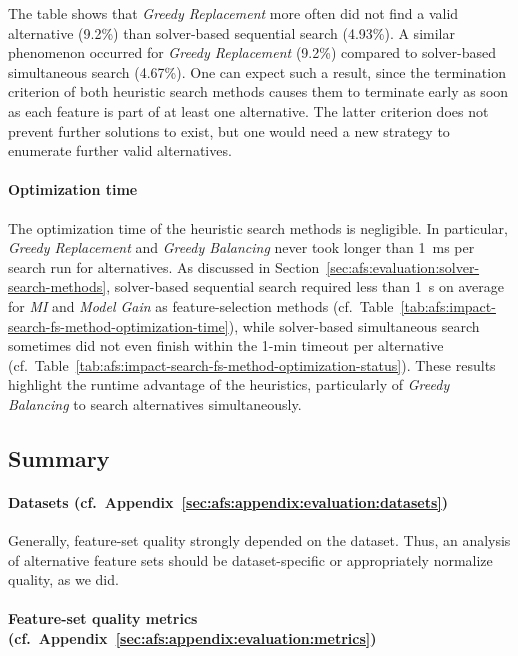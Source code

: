 \documentclass{article}
\theoremstyle{definition}
\begin{document}
The table shows that \emph{Greedy Replacement} more often did not find a valid alternative (9.2\%) than solver-based sequential search (4.93\%).
A similar phenomenon occurred for \emph{Greedy Replacement} (9.2\%) compared to solver-based simultaneous search (4.67\%).
One can expect such a result, since the termination criterion of both heuristic search methods causes them to terminate early as soon as each feature is part of at least one alternative.
The latter criterion does not prevent further solutions to exist, but one would need a new strategy to enumerate further valid alternatives.

\paragraph{Optimization time}

The optimization time of the heuristic search methods is negligible.
In particular, \emph{Greedy Replacement} and \emph{Greedy Balancing} never took longer than 1~ms per search run for alternatives.
As discussed in Section~\ref{sec:afs:evaluation:solver-search-methods}, solver-based sequential search required less than 1~s on average for \emph{MI} and \emph{Model Gain} as feature-selection methods (cf.~Table~\ref{tab:afs:impact-search-fs-method-optimization-time}), while solver-based simultaneous search sometimes did not even finish within the 1-min timeout per alternative (cf.~Table~\ref{tab:afs:impact-search-fs-method-optimization-status}).
These results highlight the runtime advantage of the heuristics, particularly of \emph{Greedy Balancing} to search alternatives simultaneously.

\subsection{Summary}
\label{sec:afs:evaluation:summary}

\paragraph{Datasets (cf.~Appendix~\ref{sec:afs:appendix:evaluation:datasets})}

Generally, feature-set quality strongly depended on the dataset.
Thus, an analysis of alternative feature sets should be dataset-specific or appropriately normalize quality, as we did.

\paragraph{Feature-set quality metrics (cf.~Appendix~\ref{sec:afs:appendix:evaluation:metrics})}
\end{document}
